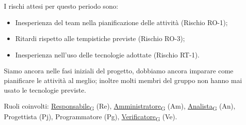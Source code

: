 I rischi attesi per questo periodo sono:
\begin{itemize}
	\item Inesperienza del team nella pianificazione delle attività (Rischio RO-1);
	\item Ritardi rispetto alle tempistiche previste (Rischio RO-3);
	\item Inesperienza nell'uso delle tecnologie adottate (Rischio RT-1).
\end{itemize}
Siamo ancora nelle fasi iniziali del progetto, dobbiamo ancora imparare come pianificare le attività al meglio; inoltre molti membri del gruppo non hanno mai usato le tecnologie previste.

Ruoli coinvolti: \href{https://7last.github.io/docs/rtb/documentazione-interna/glossario\#responsabile}{Responsabile\textsubscript{G}} (Re), \href{https://7last.github.io/docs/rtb/documentazione-interna/glossario\#amministratore}{Amministratore\textsubscript{G}} (Am), \href{https://7last.github.io/docs/rtb/documentazione-interna/glossario\#analista}{Analista\textsubscript{G}} (An), Progettista (Pj), Programmatore (Pg), \href{https://7last.github.io/docs/rtb/documentazione-interna/glossario\#verificatore}{Verificatore\textsubscript{G}} (Ve).

